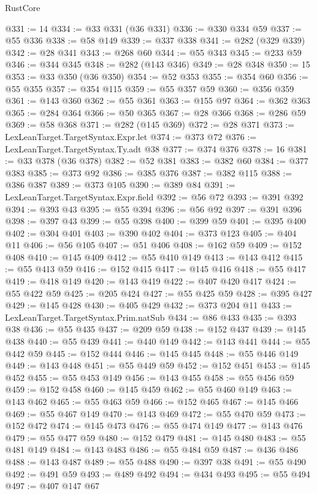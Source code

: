\begin{lexlean}{RustCore}
\begin{coremodule}
@331 := 14
@334 := @33 @331 (@36 @331)
@336 := @330 @334 @59
@337 := @55 @336
@338 := @58 @149
@339 := @337 @338
@341 := @282 (@329 @339)
@342 := @28 @341
@343 := @268 @60
@344 := @55 @343
@345 := @233 @59
@346 := @344 @345
@348 := @282 (@143 @346)
@349 := @28 @348
@350 := 15
@353 := @33 @350 (@36 @350)
@354 := @52 @353
@355 := @354 @60
@356 := @55 @355
@357 := @354 @115
@359 := @55 @357 @59
@360 := @356 @359
@361 := @143 @360
@362 := @55 @361
@363 := @155 @97
@364 := @362 @363
@365 := @284 @364
@366 := @50 @365
@367 := @28 @366
@368 := @286 @59
@369 := @58 @368
@371 := @282 (@145 @369)
@372 := @28 @371
@373 := LexLeanTarget.TargetSyntax.Expr.let
@374 := @373 @72
@376 := LexLeanTarget.TargetSyntax.Ty.adt @38
@377 := @374 @376
@378 := 16
@381 := @33 @378 (@36 @378)
@382 := @52 @381
@383 := @382 @60
@384 := @377 @383
@385 := @373 @92
@386 := @385 @376
@387 := @382 @115
@388 := @386 @387
@389 := @373 @105
@390 := @389 @84
@391 := LexLeanTarget.TargetSyntax.Expr.field
@392 := @56 @72
@393 := @391 @392
@394 := @393 @43
@395 := @55 @394
@396 := @56 @92
@397 := @391 @396
@398 := @397 @43
@399 := @55 @398
@400 := @399 @59
@401 := @395 @400
@402 := @304 @401
@403 := @390 @402
@404 := @373 @123
@405 := @404 @11
@406 := @56 @105
@407 := @51 @406
@408 := @162 @59
@409 := @152 @408
@410 := @145 @409
@412 := @55 @410 @149
@413 := @143 @412
@415 := @55 @413 @59
@416 := @152 @415
@417 := @145 @416
@418 := @55 @417
@419 := @418 @149
@420 := @143 @419
@422 := @407 @420 @417
@424 := @55 @422 @59
@425 := @205 @424
@427 := @55 @425 @59
@428 := @395 @427
@429 := @145 @428
@430 := @405 @429
@432 := @373 @204 @11
@433 := LexLeanTarget.TargetSyntax.Prim.natSub
@434 := @86 @433
@435 := @393 @38
@436 := @55 @435
@437 := @209 @59
@438 := @152 @437
@439 := @145 @438
@440 := @55 @439
@441 := @440 @149
@442 := @143 @441
@444 := @55 @442 @59
@445 := @152 @444
@446 := @145 @445
@448 := @55 @446 @149
@449 := @143 @448
@451 := @55 @449 @59
@452 := @152 @451
@453 := @145 @452
@455 := @55 @453 @149
@456 := @143 @455
@458 := @55 @456 @59
@459 := @152 @458
@460 := @145 @459
@462 := @55 @460 @149
@463 := @143 @462
@465 := @55 @463 @59
@466 := @152 @465
@467 := @145 @466
@469 := @55 @467 @149
@470 := @143 @469
@472 := @55 @470 @59
@473 := @152 @472
@474 := @145 @473
@476 := @55 @474 @149
@477 := @143 @476
@479 := @55 @477 @59
@480 := @152 @479
@481 := @145 @480
@483 := @55 @481 @149
@484 := @143 @483
@486 := @55 @484 @59
@487 := @436 @486
@488 := @143 @487
@489 := @55 @488
@490 := @397 @38
@491 := @55 @490
@492 := @491 @59
@493 := @489 @492
@494 := @434 @493
@495 := @55 @494
@497 := @407 @147 @67

\end{coremodule}
\end{lexlean}
